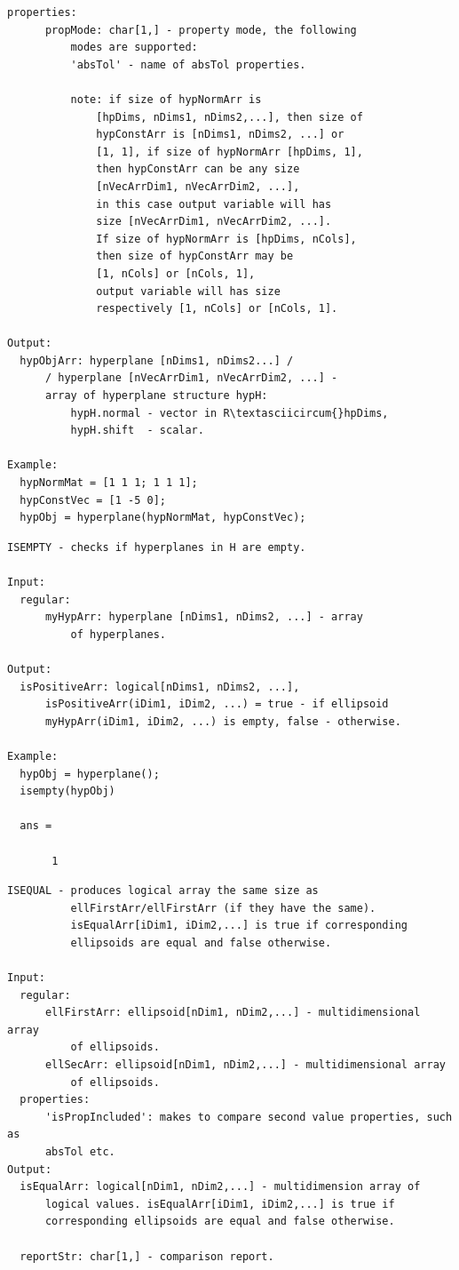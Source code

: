 \documentclass[letterpaper,10pt,english]{sphinxmanual}
\begin{document}
\begin{Verbatim}[commandchars=\\\{\}]
    properties:
      propMode: char[1,] - property mode, the following
          modes are supported:
          'absTol' - name of absTol properties.

          note: if size of hypNormArr is
              [hpDims, nDims1, nDims2,...], then size of
              hypConstArr is [nDims1, nDims2, ...] or
              [1, 1], if size of hypNormArr [hpDims, 1],
              then hypConstArr can be any size
              [nVecArrDim1, nVecArrDim2, ...],
              in this case output variable will has
              size [nVecArrDim1, nVecArrDim2, ...].
              If size of hypNormArr is [hpDims, nCols],
              then size of hypConstArr may be
              [1, nCols] or [nCols, 1],
              output variable will has size
              respectively [1, nCols] or [nCols, 1].

Output:
  hypObjArr: hyperplane [nDims1, nDims2...] /
      / hyperplane [nVecArrDim1, nVecArrDim2, ...] -
      array of hyperplane structure hypH:
          hypH.normal - vector in R\textasciicircum{}hpDims,
          hypH.shift  - scalar.

Example:
  hypNormMat = [1 1 1; 1 1 1];
  hypConstVec = [1 -5 0];
  hypObj = hyperplane(hypNormMat, hypConstVec);
\end{Verbatim}

\begin{Verbatim}[commandchars=\\\{\}]
ISEMPTY - checks if hyperplanes in H are empty.

Input:
  regular:
      myHypArr: hyperplane [nDims1, nDims2, ...] - array
          of hyperplanes.

Output:
  isPositiveArr: logical[nDims1, nDims2, ...],
      isPositiveArr(iDim1, iDim2, ...) = true - if ellipsoid
      myHypArr(iDim1, iDim2, ...) is empty, false - otherwise.

Example:
  hypObj = hyperplane();
  isempty(hypObj)

  ans =

       1
\end{Verbatim}

\begin{Verbatim}[commandchars=\\\{\}]
ISEQUAL - produces logical array the same size as
          ellFirstArr/ellFirstArr (if they have the same).
          isEqualArr[iDim1, iDim2,...] is true if corresponding
          ellipsoids are equal and false otherwise.

Input:
  regular:
      ellFirstArr: ellipsoid[nDim1, nDim2,...] - multidimensional array
          of ellipsoids.
      ellSecArr: ellipsoid[nDim1, nDim2,...] - multidimensional array
          of ellipsoids.
  properties:
      'isPropIncluded': makes to compare second value properties, such as
      absTol etc.
Output:
  isEqualArr: logical[nDim1, nDim2,...] - multidimension array of
      logical values. isEqualArr[iDim1, iDim2,...] is true if
      corresponding ellipsoids are equal and false otherwise.

  reportStr: char[1,] - comparison report.
\end{Verbatim}
\end{document}
